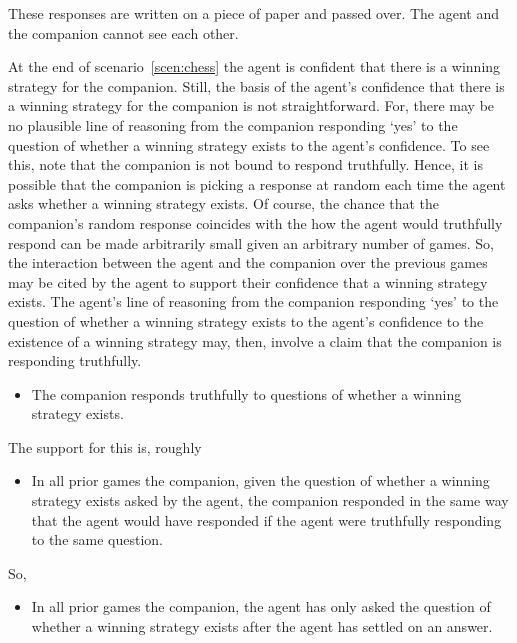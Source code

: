 \documentclass[10pt]{article}
\begin{document}
\begin{scenario}[Chess]
  \begin{note}
    These responses are written on a piece of paper and passed over.
    The agent and the companion cannot see each other.
  \end{note}
\end{scenario}

At the end of scenario~\ref{scen:chess} the agent is confident that there is a winning strategy for the companion.
Still, the basis of the agent's confidence that there is a winning strategy for the companion is not straightforward.
For, there may be no plausible line of reasoning from the companion responding `yes' to the question of whether a winning strategy exists to the agent's confidence.
To see this, note that the companion is not bound to respond truthfully.
Hence, it is possible that the companion is picking a response at random each time the agent asks whether a winning strategy exists.
Of course, the chance that the companion's random response coincides with the how the agent would truthfully respond can be made arbitrarily small given an arbitrary number of games.
So, the interaction between the agent and the companion over the previous games may be cited by the agent to support their confidence that a winning strategy exists.
The agent's line of reasoning from the companion responding `yes' to the question of whether a winning strategy exists to the agent's confidence to the existence of a winning strategy may, then, involve a claim that the companion is responding truthfully.

\begin{itemize}
\item The companion responds truthfully to questions of whether a winning strategy exists.
\end{itemize}

The support for this is, roughly

\begin{itemize}
\item In all prior games the companion, given the question of whether a winning strategy exists asked by the agent, the companion responded in the same way that the agent would have responded if the agent were truthfully responding to the same question.
\end{itemize}

So,

\begin{itemize}
\item In all prior games the companion, the agent has only asked the question of whether a winning strategy exists after the agent has settled on an answer.
\end{itemize}
\end{document}
